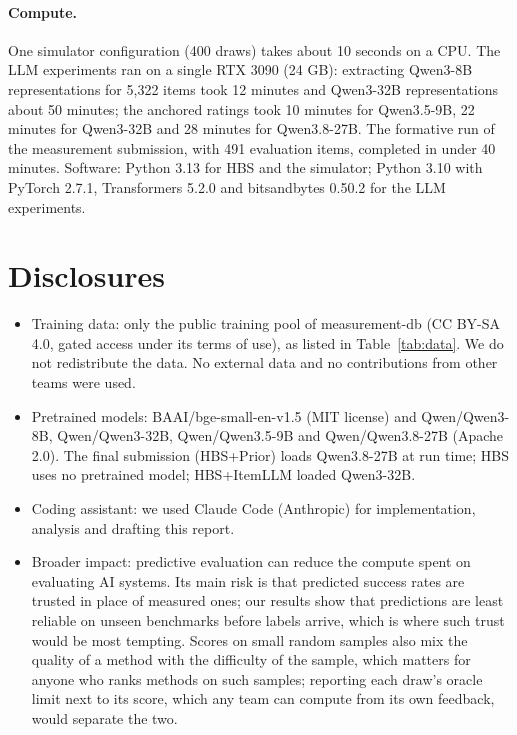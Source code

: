 \documentclass{article}
\begin{document}
\paragraph{Compute.} One simulator configuration (400 draws) takes about 10 seconds on a CPU. The LLM experiments ran on a single RTX 3090 (24 GB): extracting Qwen3-8B representations for 5,322 items took 12 minutes and Qwen3-32B representations about 50 minutes; the anchored ratings took 10 minutes for Qwen3.5-9B, 22 minutes for Qwen3-32B and 28 minutes for Qwen3.8-27B. The formative run of the measurement submission, with 491 evaluation items, completed in under 40 minutes. Software: Python 3.13 for HBS and the simulator; Python 3.10 with PyTorch 2.7.1, Transformers 5.2.0 and bitsandbytes 0.50.2 for the LLM experiments.

\section{Disclosures}
\label{app:disclosure}

\begin{itemize}
  \item Training data: only the public training pool of measurement-db (CC BY-SA 4.0, gated access under its terms of use), as listed in Table~\ref{tab:data}. We do not redistribute the data. No external data and no contributions from other teams were used.
  \item Pretrained models: BAAI/bge-small-en-v1.5 (MIT license) and Qwen/Qwen3-8B, Qwen/Qwen3-32B, Qwen/Qwen3.5-9B and Qwen/Qwen3.8-27B (Apache 2.0). The final submission (HBS+Prior) loads Qwen3.8-27B at run time; HBS uses no pretrained model; HBS+ItemLLM loaded Qwen3-32B.
  \item Coding assistant: we used Claude Code (Anthropic) for implementation, analysis and drafting this report.
  \item Broader impact: predictive evaluation can reduce the compute spent on evaluating AI systems. Its main risk is that predicted success rates are trusted in place of measured ones; our results show that predictions are least reliable on unseen benchmarks before labels arrive, which is where such trust would be most tempting. Scores on small random samples also mix the quality of a method with the difficulty of the sample, which matters for anyone who ranks methods on such samples; reporting each draw's oracle limit next to its score, which any team can compute from its own feedback, would separate the two.
\end{itemize}
\end{document}
